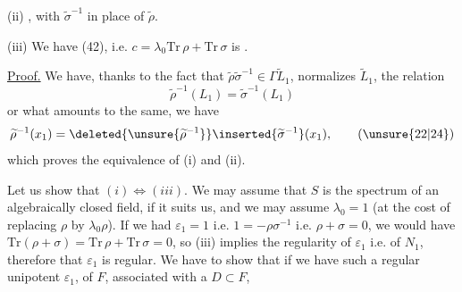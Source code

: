 
(ii) , with $\widetilde\sigma^{-1}$ in place of $\widetilde\rho$.


(iii) We have (42), i.e. $c=\lambda_0\mathrm{Tr}\,\rho+\mathrm{Tr}\,\sigma$ is .

\uline{Proof.} We have, thanks to the fact that $\widetilde\rho\widetilde\sigma^{-1}\in\Gamma\widetilde L_1$, normalizes $\widetilde L_1$,  the relation
\[
\widetilde\rho^{-1}(L_1)=\widetilde\sigma^{-1}(L_1)
\]
or what amounts to the same, we have
\[
\widetilde\rho^{-1}(x_1)=\deleted{\unsure{\widetilde\rho^{-1}}}\inserted{\widetilde\sigma^{-1}}(x_1), \tag{\unsure{22|24}}
\]
which proves the equivalence of (i) and (ii).

Let us show that $(i)\Longleftrightarrow(iii)$. We may assume that $S$ is the spectrum of an algebraically closed field, if it suits us, and we may assume $\lambda_0=1$ (at the cost  of replacing $\rho$ by $\lambda_0\rho$). If we had $\varepsilon_1=1$ i.e. \deleted{$\rho+\sigma$} $1=-\rho\sigma^{-1}$ i.e. $\rho+\sigma=0$, we would have  $\mathrm{Tr}(\rho+\sigma)=\mathrm{Tr}\,\rho+\mathrm{Tr}\,\sigma=0$, so (iii) implies the regularity of $\varepsilon_1$ i.e. of $N_1$,   therefore that $\varepsilon_1$ is regular. We have to show that if we have such a regular unipotent   $\varepsilon_1$, of $F$, associated with a $D\subset F$,


